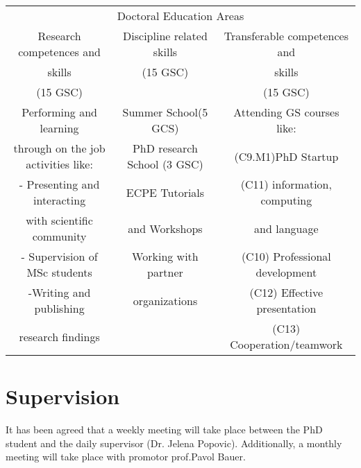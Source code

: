 \documentclass[]{scrreprt}
\begin{document}
\begin{table}[h!]
	\centering 
	\begin{adjustbox}{width=1\textwidth}
		\small
		\begin{tabular}{c c c} 
			\multicolumn{3}{c}{Doctoral Education Areas} \\ 
			\cmidrule(l){1-3}
			Research competences and  & Discipline related skills & Transferable competences and    \\ %
			skills & (15 GSC) & skills \\
			(15 GSC) &        & (15 GSC) \\
			\midrule %
			\midrule
		 Performing and learning  & Summer School(5 GCS) & Attending GS courses like: \\
		 through on the job activities like: & PhD research School (3 GSC) & (C9.M1)PhD Startup \\
		 - Presenting and interacting & ECPE Tutorials & (C11) information, computing \\
		 with scientific community & and Workshops & and language\\
		 - Supervision of MSc students & Working with partner &  (C10) Professional development  \\
		 -Writing and publishing & organizations  &  (C12)  Effective presentation\\
		  research findings &  & (C13) Cooperation/teamwork \\
			\bottomrule %
		\end{tabular}
	\end{adjustbox}
	\label{tab:template} %
\end{table}

\section{Supervision}
It has been agreed that a weekly meeting will take place between the PhD student and the daily supervisor (Dr. Jelena Popovic). Additionally, a monthly meeting will take place with promotor prof.Pavol Bauer.
\end{document}
